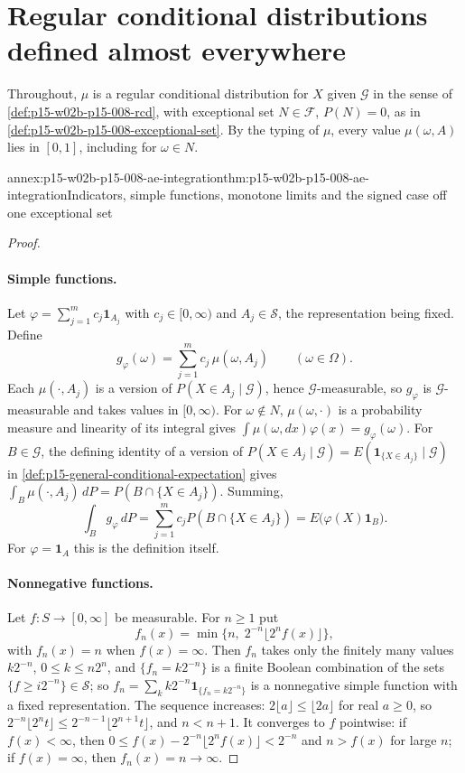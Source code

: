 \section{Regular conditional distributions defined almost everywhere}
\label{sec:annex-p15-w02b-p15-008-ae-kernels}

Throughout, \(\mu\) is a regular conditional distribution for \(X\) given
\(\mathcal G\) in the sense of \cref{def:p15-w02b-p15-008-rcd}, with
exceptional set \(N\in\mathcal F\), \(P(N)=0\), as in
\cref{def:p15-w02b-p15-008-exceptional-set}. By the typing of \(\mu\),
every value \(\mu(\omega,A)\) lies in \([0,1]\), including for
\(\omega\in N\).

\begin{annexitem}{annex:p15-w02b-p15-008-ae-integration}{thm:p15-w02b-p15-008-ae-integration}{Indicators, simple functions, monotone limits and the signed case off one exceptional set}
\begin{proof}
\paragraph{Simple functions.}
Let \(\varphi=\sum_{j=1}^m c_j\mathbf1_{A_j}\) with \(c_j\in[0,\infty)\)
and \(A_j\in\mathcal S\), the representation being fixed. Define
\[
            g_\varphi(\omega)=\sum_{j=1}^m c_j\,\mu(\omega,A_j)
                                   \qquad(\omega\in\Omega).
\]
Each \(\mu(\cdot,A_j)\) is a version of \(P(X\in A_j\mid\mathcal G)\), hence
\(\mathcal G\)-measurable, so \(g_\varphi\) is \(\mathcal G\)-measurable and
takes values in \([0,\infty)\).
For \(\omega\notin N\), \(\mu(\omega,\cdot)\) is a probability measure and
linearity of its integral gives \(\int\mu(\omega,dx)\varphi(x)=g_\varphi(\omega)\).
For \(B\in\mathcal G\), the defining identity of a version of
\(P(X\in A_j\mid\mathcal G)=E(\mathbf1_{\{X\in A_j\}}\mid\mathcal G)\) in
\cref{def:p15-general-conditional-expectation} gives
\(\int_B\mu(\cdot,A_j)\,dP=P(B\cap\{X\in A_j\})\). Summing,
\[
 \int_Bg_\varphi\,dP=\sum_{j=1}^mc_jP(B\cap\{X\in A_j\})
                    =E\bigl(\varphi(X)\mathbf1_B\bigr).
 \tag{1}
\]
For \(\varphi=\mathbf1_A\) this is the definition itself.

\paragraph{Nonnegative functions.}
Let \(f:S\to[0,\infty]\) be measurable. For \(n\geq1\) put
\[
           f_n(x)=\min\bigl\{n,\;2^{-n}\lfloor2^nf(x)\rfloor\bigr\},
\]
with \(f_n(x)=n\) when \(f(x)=\infty\).
Then \(f_n\) takes only the finitely many values \(k2^{-n}\),
\(0\leq k\leq n2^n\), and \(\{f_n=k2^{-n}\}\) is a finite Boolean
combination of the sets \(\{f\geq i2^{-n}\}\in\mathcal S\); so
\(f_n=\sum_kk2^{-n}\mathbf1_{\{f_n=k2^{-n}\}}\) is a nonnegative simple
function with a fixed representation.
The sequence increases: \(2\lfloor a\rfloor\leq\lfloor2a\rfloor\) for real
\(a\geq0\), so \(2^{-n}\lfloor2^nt\rfloor\leq2^{-n-1}\lfloor2^{n+1}t\rfloor\),
and \(n<n+1\). It converges to \(f\) pointwise: if \(f(x)<\infty\), then
\(0\leq f(x)-2^{-n}\lfloor2^nf(x)\rfloor<2^{-n}\) and \(n>f(x)\) for large
\(n\); if \(f(x)=\infty\), then \(f_n(x)=n\to\infty\).


\end{proof}
\end{annexitem}
